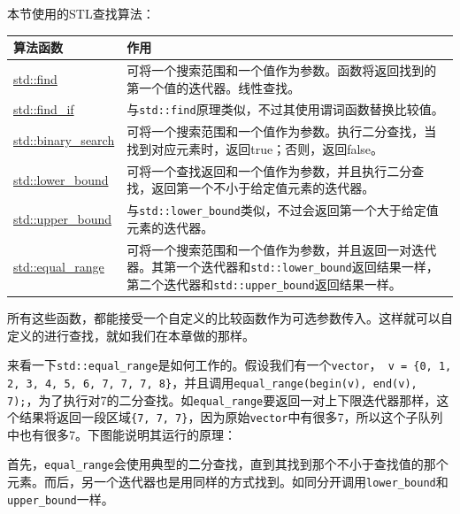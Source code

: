 
本节使用的STL查找算法：

\begin{table}[htbp]\centering
\begin{tabularx}{\textwidth}{lX}
\toprule
算法函数 & 作用 \\
\midrule
\href{https://zh.cppreference.com/w/cpp/algorithm/find}{std::find} & 可将一个搜索范围和一个值作为参数。函数将返回找到的第一个值的迭代器。线性查找。 \\
\href{https://zh.cppreference.com/w/cpp/algorithm/find}{std::find\_if} & 与\texttt{std::find}原理类似，不过其使用谓词函数替换比较值。 \\
\href{https://zh.cppreference.com/w/cpp/algorithm/binary_search}{std::binary\_search} & 可将一个搜索范围和一个值作为参数。执行二分查找，当找到对应元素时，返回true；否则，返回false。 \\
\href{https://zh.cppreference.com/w/cpp/algorithm/lower_bound}{std::lower\_bound} & 可将一个查找返回和一个值作为参数，并且执行二分查找，返回第一个不小于给定值元素的迭代器。 \\
\href{https://zh.cppreference.com/w/cpp/algorithm/upper_bound}{std::upper\_bound} & 与\texttt{std::lower\_bound}类似，不过会返回第一个大于给定值元素的迭代器。 \\
\href{https://zh.cppreference.com/w/cpp/algorithm/equal_range}{std::equal\_range} & 可将一个搜索范围和一个值作为参数，并且返回一对迭代器。其第一个迭代器和\texttt{std::lower\_bound}返回结果一样，第二个迭代器和\texttt{std::upper\_bound}返回结果一样。 \\
\bottomrule
\end{tabularx}
\end{table}

所有这些函数，都能接受一个自定义的比较函数作为可选参数传入。这样就可以自定义的进行查找，就如我们在本章做的那样。

来看一下\texttt{std::equal\_range}是如何工作的。假设我们有一个\texttt{vector}，\texttt{ v = \{0, 1, 2, 3, 4, 5, 6, 7, 7, 7, 8\}}，并且调用\texttt{equal\_range(begin(v), end(v), 7);}，为了执行对7的二分查找。如\texttt{equal\_range}要返回一对上下限迭代器那样，这个结果将返回一段区域\texttt{\{7, 7, 7\}}，因为原始\texttt{vector}中有很多7，所以这个子队列中也有很多7。下图能说明其运行的原理：


首先，\texttt{equal\_range}会使用典型的二分查找，直到其找到那个不小于查找值的那个元素。而后，另一个迭代器也是用同样的方式找到。如同分开调用\texttt{lower\_bound}和\texttt{upper\_bound}一样。

